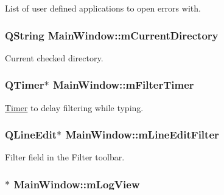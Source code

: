 List of user defined applications to open errors with. 

\hypertarget{class_main_window_ac43e5a474fe32ed819b1b7e2ca49e311}{
\subsubsection[{m\-Current\-Directory}]{\setlength{\rightskip}{0pt plus 5cm}Q\-String Main\-Window\-::m\-Current\-Directory\hspace{0.3cm}{\ttfamily [protected]}}}\label{class_main_window_ac43e5a474fe32ed819b1b7e2ca49e311}


Current checked directory. 

\hypertarget{class_main_window_a727873c771d824448c4b28e0a362ac4e}{
\subsubsection[{m\-Filter\-Timer}]{\setlength{\rightskip}{0pt plus 5cm}Q\-Timer$\ast$ Main\-Window\-::m\-Filter\-Timer\hspace{0.3cm}{\ttfamily [protected]}}}\label{class_main_window_a727873c771d824448c4b28e0a362ac4e}


\hyperlink{class_timer}{Timer} to delay filtering while typing. 

\hypertarget{class_main_window_a87a6c80c7093eb0ddc41d70fea129b18}{
\subsubsection[{m\-Line\-Edit\-Filter}]{\setlength{\rightskip}{0pt plus 5cm}Q\-Line\-Edit$\ast$ Main\-Window\-::m\-Line\-Edit\-Filter\hspace{0.3cm}{\ttfamily [protected]}}}\label{class_main_window_a87a6c80c7093eb0ddc41d70fea129b18}


Filter field in the Filter toolbar. 

\hypertarget{class_main_window_ad374532b6d59f49e92083d75a6d8c12c}{
\subsubsection[{m\-Log\-View}]{$\ast$ Main\-Window\-::m\-Log\-View\hspace{0.3cm}{\ttfamily [protected]}}}\label{class_main_window_ad374532b6d59f49e92083d75a6d8c12c}


